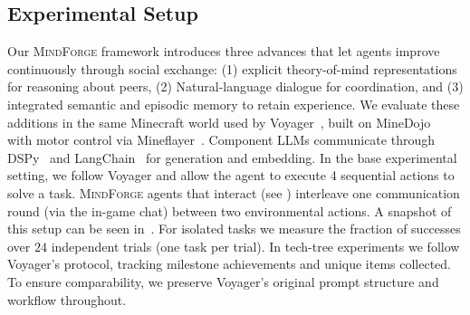 \documentclass{article}
\newcommand{\collabvoyager}[0]{\mbox{\textsc{MindForge}}\xspace}
\begin{document}
\subsection{Experimental Setup}
\label{ssec:setup}

Our \collabvoyager framework introduces three advances that let agents improve continuously through social exchange: (1) explicit theory-of-mind representations for reasoning about peers, (2) Natural-language dialogue for coordination, and (3) integrated semantic and episodic memory to retain experience.
We evaluate these additions in the same Minecraft world used by Voyager~\citep{wang2023voyager}, built on MineDojo~\citep{fan2022minedojo} with motor control via Mineflayer~\citep{mineflayer}. Component LLMs communicate through DSPy~\citep{khattab2024dspy, khattab2022demonstrate} and LangChain~\citep{langchain2024} for generation and embedding. In the base experimental setting, we follow Voyager \cite{wang2023voyager} and allow the agent to execute 4 sequential actions to solve a task. \collabvoyager agents that interact (see ) interleave one communication round (via the in-game chat) between two environmental actions. A snapshot of this setup can be seen in~.
For isolated tasks we measure the fraction of successes over $24$ independent trials (one task per trial). In tech-tree experiments we follow Voyager's protocol, tracking milestone achievements and unique items collected. To ensure comparability, we preserve Voyager's original prompt structure and workflow throughout.
\end{document}
